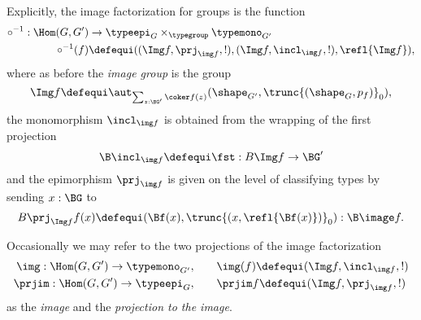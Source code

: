 \begin{definition}
  \label{def:image}
Explicitly, the image factorization for groups is the function
\begin{align*}
\circ^{-1}:\Hom(G,G')&\to\typeepi_G\times_{\typegroup}\typemono_{G'}\\
\circ^{-1}(f)&\defequi ((\Img f,\prj_{\img f},!),(\Img f,\incl_{\img f},!),\refl{\Img f}),
\end{align*}
    where as before the \emph{image group} is the group
    $$\Img f\defequi \aut_{\sum_{z:\BG'}\coker f(z)}(\shape_{G'},\trunc{(\shape_G,p_f)}_0),$$
    the monomorphism $\incl_{\img f}$ is obtained from the wrapping of the first projection
    $$\B\incl_{\img f}\defequi\fst: B\Img f\to \BG'$$
    and
the epimorphism
  $\prj_{\img f}$  is given on the level of classifying types by sending $x:\BG$ to
  $$B\prj_{\Img f} f(x)\defequi (\Bf(x),\trunc{(x,\refl{\Bf(x)})}_0):\B\image f.$$

    
 Occasionally we may refer to the two projections of the image factorization
 \begin{align*}
    \img:\Hom(G,G')\to\typemono_{G'},\qquad&\img(f)\defequi(\Img f,\incl_{\img f},!)\\
 \prjim:\Hom(G,G')\to\typeepi_G, \qquad&\prjim f\defequi(\Img f,\prj_{\img f},!)
  \end{align*}
  as the \emph{image} and the \emph{projection to the image}.
\end{definition}


